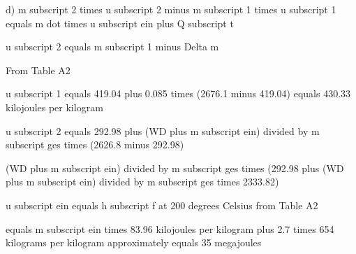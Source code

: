 d) m subscript 2 times u subscript 2 minus m subscript 1 times u subscript 1 equals m dot times u subscript ein plus Q subscript t

u subscript 2 equals m subscript 1 minus Delta m

From Table A2

u subscript 1 equals 419.04 plus 0.085 times (2676.1 minus 419.04) equals 430.33 kilojoules per kilogram

u subscript 2 equals 292.98 plus (WD plus m subscript ein) divided by m subscript ges times (2626.8 minus 292.98)

(WD plus m subscript ein) divided by m subscript ges times (292.98 plus (WD plus m subscript ein) divided by m subscript ges times 2333.82)

u subscript ein equals h subscript f at 200 degrees Celsius from Table A2

equals m subscript ein times 83.96 kilojoules per kilogram plus 2.7 times 654 kilograms per kilogram approximately equals 35 megajoules
